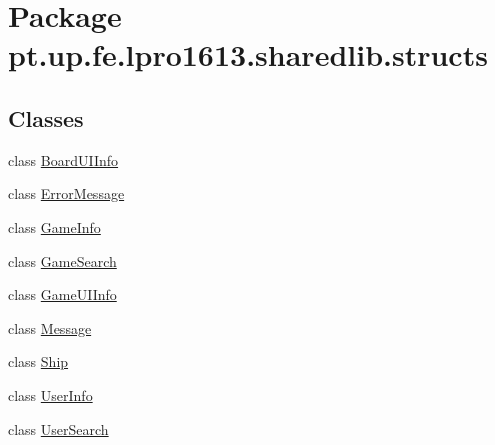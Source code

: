 \hypertarget{namespacept_1_1up_1_1fe_1_1lpro1613_1_1sharedlib_1_1structs}{}\section{Package pt.\+up.\+fe.\+lpro1613.\+sharedlib.\+structs}
\label{namespacept_1_1up_1_1fe_1_1lpro1613_1_1sharedlib_1_1structs}
\subsection*{Classes}
\begin{DoxyCompactItemize}
\item 
class \hyperlink{classpt_1_1up_1_1fe_1_1lpro1613_1_1sharedlib_1_1structs_1_1_board_u_i_info}{Board\+U\+I\+Info}
\item 
class \hyperlink{classpt_1_1up_1_1fe_1_1lpro1613_1_1sharedlib_1_1structs_1_1_error_message}{Error\+Message}
\item 
class \hyperlink{classpt_1_1up_1_1fe_1_1lpro1613_1_1sharedlib_1_1structs_1_1_game_info}{Game\+Info}
\item 
class \hyperlink{classpt_1_1up_1_1fe_1_1lpro1613_1_1sharedlib_1_1structs_1_1_game_search}{Game\+Search}
\item 
class \hyperlink{classpt_1_1up_1_1fe_1_1lpro1613_1_1sharedlib_1_1structs_1_1_game_u_i_info}{Game\+U\+I\+Info}
\item 
class \hyperlink{classpt_1_1up_1_1fe_1_1lpro1613_1_1sharedlib_1_1structs_1_1_message}{Message}
\item 
class \hyperlink{classpt_1_1up_1_1fe_1_1lpro1613_1_1sharedlib_1_1structs_1_1_ship}{Ship}
\item 
class \hyperlink{classpt_1_1up_1_1fe_1_1lpro1613_1_1sharedlib_1_1structs_1_1_user_info}{User\+Info}
\item 
class \hyperlink{classpt_1_1up_1_1fe_1_1lpro1613_1_1sharedlib_1_1structs_1_1_user_search}{User\+Search}
\end{DoxyCompactItemize}
